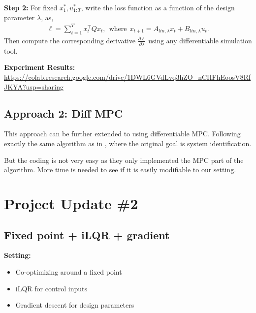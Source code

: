 \documentclass[conference]{IEEEtran}
\begin{document}
\textbf{Step 2:}
For fixed $x_1^*, u_{1:T}^*$, write the loss function as a function of the design parameter $\lambda$, as,
\begin{align*}
\ell = \sum\limits_{t=1}^{T} x_t^\top Q x_t,~~\text{where}~~ x_{t+1} = A_{lin,\lambda}x_t + B_{lin,\lambda}u_t.
\end{align*}
Then compute the corresponding derivative $\frac{\partial \ell}{\partial \lambda}$ using any differentiable simulation tool.





\textbf{Experiment Results:} \url{https://colab.research.google.com/drive/1DWL6GVdLvq3hZO_nCHFhEoosV8RfJKYA?usp=sharing}





\subsection{Approach 2: Diff MPC\cite{amos2018differentiable}}

This approach can be further extended to using differentiable MPC. Following exactly the same algorithm as in \cite{amos2018differentiable}, where the original goal is system identification.


But the coding is not very easy as they only implemented the MPC part of the algorithm. More time is needed to see if it is easily modifiable to our setting.


\section{Project Update \#2}


\subsection{Fixed point + iLQR + gradient}


\textbf{Setting:}
\vspace{-5pt}
\begin{itemize}
    \setlength{\itemsep}{0pt}
    \setlength{\parsep}{0pt}
    \setlength{\parskip}{0pt}
    \item Co-optimizing around a fixed point
    \item iLQR for control inputs
    \item Gradient descent for design parameters
\end{itemize}
\end{document}
